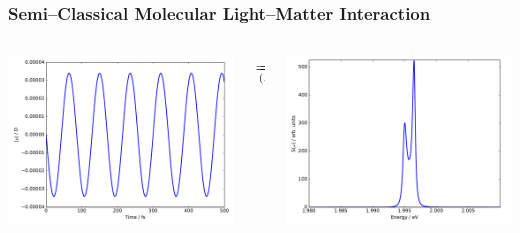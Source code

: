 \documentclass{beamer}
\begin{document}
\begin{frame}
\frametitle{Semi--Classical Molecular Light--Matter Interaction}

\begin{columns}
\begin{column}{0.45\textwidth}
\includegraphics[width=\textwidth]{na_fss_dipole}
\end{column}
\begin{column}{0.1\textwidth}
$\xRightarrow[(Pade)]{\text{FFT}}$
\end{column}
\begin{column}{0.45\textwidth}
\includegraphics[width=\textwidth]{na_fss}
\end{column}
\end{columns}
\end{frame}
\end{document}
